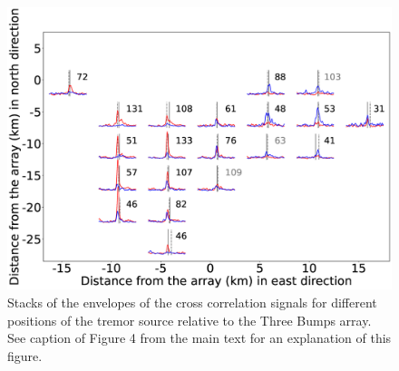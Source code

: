 \documentclass[draft]{agujournal2019}
\begin{document}
\begin{figure}
\noindent\includegraphics[width=\textwidth, trim={2.5cm 0.5cm 5cm 1.5cm},clip]{figures/TB_PWS_PWS_0.eps}
\caption{Stacks of the envelopes of the cross correlation signals for different positions of the tremor source relative to the Three Bumps array. See caption of Figure 4 from the main text for an explanation of this figure.}
\label{pngfiguresample}
\end{figure}
\end{document}
